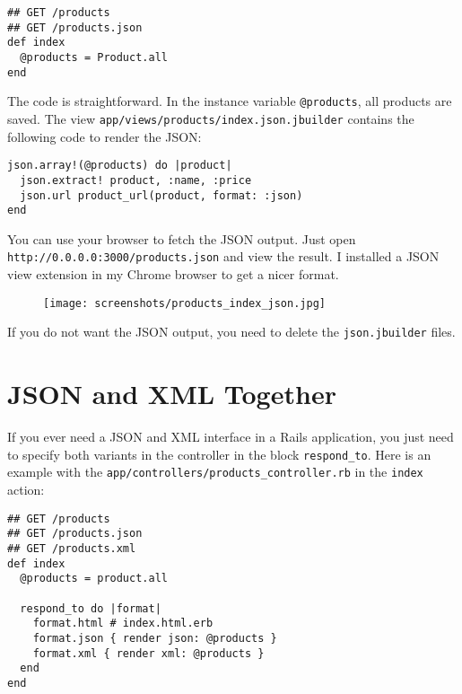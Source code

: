 \documentclass[a4paper]{book}
\begin{document}
\begin{shaded}\begin{verbatim}
## GET /products
## GET /products.json
def index
  @products = Product.all
end
\end{verbatim}\end{shaded}

The code is straightforward. In the instance variable \texttt{@products}, all products are saved. The view \texttt{app/views/products/index.json.jbuilder} contains the following code to render the JSON:

\begin{shaded}\begin{verbatim}
json.array!(@products) do |product|
  json.extract! product, :name, :price
  json.url product_url(product, format: :json)
end
\end{verbatim}\end{shaded}

You can use your browser to fetch the JSON output. Just open \texttt{http://0.0.0.0:3000/products.json} and view the result. I installed a JSON view extension in my Chrome browser to get a nicer format.

\begin{figure}[htbp]
\centering
\texttt{[image: screenshots/products\_index\_json.jpg]}
\end{figure}

If you do not want the JSON output, you need to delete the \texttt{json.jbuilder} files.

\section{JSON and XML Together}\label{json-and-xml-together}

If you ever need a JSON and XML interface in a Rails application, you just need to specify both variants in the controller in the block \texttt{respond\_to}. Here is an example with the \texttt{app/controllers/products\_controller.rb} in the \texttt{index} action:

\begin{shaded}\begin{verbatim}
## GET /products
## GET /products.json
## GET /products.xml
def index
  @products = product.all

  respond_to do |format|
    format.html # index.html.erb
    format.json { render json: @products }
    format.xml { render xml: @products }
  end
end
\end{verbatim}\end{shaded}
\end{document}
